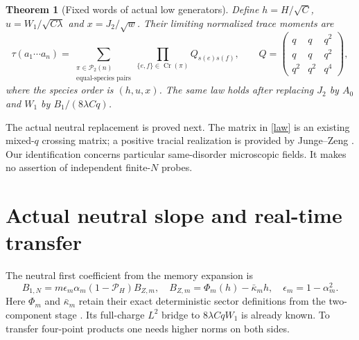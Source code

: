 \documentclass[11pt]{article}
\newcommand{\PP}{\mathcal P_H}
\newtheorem{theorem}{Theorem}
\begin{document}
\begin{theorem}[Fixed words of actual low generators]
Define $h=H/\sqrt C$, $u=W_1/\sqrt{C\lambda}$ and $x=J_2/\sqrt w$.
Their limiting normalized trace moments are
\begin{equation}
 \tau(a_1\cdots a_n)=
 \sum_{\substack{\pi\in\mathcal P_2(n)\\\text{equal-species pairs}}}
       \prod_{\{e,f\}\in\operatorname{Cr}(\pi)}Q_{s(e)s(f)},
 \qquad
 Q=\begin{pmatrix}q&q&q^2\\q&q&q^2\\q^2&q^2&q^4\end{pmatrix},
 \label{law}
\end{equation}
where the species order is $(h,u,x)$. The same law holds after
replacing $J_2$ by $A_0$ and $W_1$ by $B_1/(8\lambda Cq)$.
\end{theorem}
The actual neutral replacement is proved next. The matrix in
\eqref{law} is an existing mixed-$q$ crossing matrix; a positive
tracial realization is provided by Junge--Zeng \cite{JZ}.
Our identification concerns particular same-disorder microscopic
fields. It makes no assertion of independent finite-$N$ probes.

\newpage
\section{Actual neutral slope and real-time transfer}
The neutral first coefficient from the memory expansion is
\begin{equation}
 B_{1,N}=m\epsilon_m\alpha_m(1-\PP)B_{Z,m},\quad
 B_{Z,m}=\Phi_m(h)-\bar\kappa_mh,\quad
 \epsilon_m=1-\alpha_m^2.
\end{equation}
Here $\Phi_m$ and $\bar\kappa_m$ retain their exact deterministic
sector definitions from the two-component stage \cite{Memory}.
Its full-charge $L^2$ bridge to $8\lambda CqW_1$ is already known.
To transfer four-point products one needs higher norms on both sides.
\end{document}
